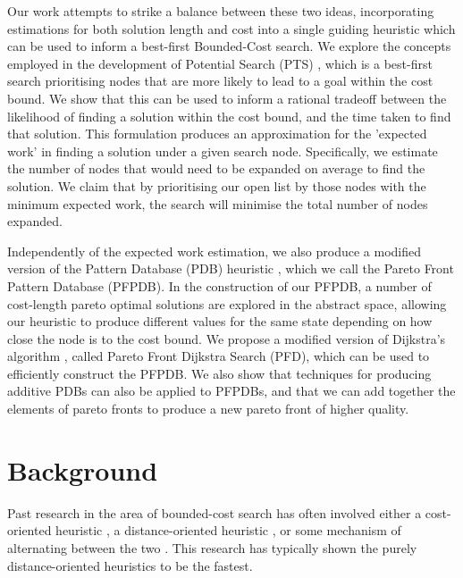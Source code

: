 \documentclass[letterpaper]{article} %
\begin{document}
Our work attempts to strike a balance between these two ideas,
incorporating estimations for both solution length and cost into
a single guiding heuristic which can be used to inform a best-first Bounded-Cost search.
We explore the concepts employed in the development of Potential Search (PTS) \cite{stern2011potential},
which is a best-first search prioritising nodes that are more likely
to lead to a goal within the cost bound.
We show that this can be used to inform a rational tradeoff between the likelihood of finding a solution within the cost bound,
and the time taken to find that solution.
This formulation produces an approximation for the 'expected work'
in finding a solution under a given search node.
Specifically, we estimate the number of nodes that
would need to be expanded on average to find the solution.
We claim that by prioritising our open list by those nodes with the minimum expected work,
the search will minimise the total number of nodes expanded.

Independently of the expected work estimation,
we also produce a modified version of the Pattern Database (PDB) heuristic \cite{culberson1996searching},
which we call the Pareto Front Pattern Database (PFPDB).
In the construction of our PFPDB, a number of cost-length pareto optimal solutions are explored in the abstract space,
allowing our heuristic to produce different values for the same state
depending on how close the node is to the cost bound.
We propose a modified version of Dijkstra's algorithm \cite{dijkstra1959note}, called Pareto Front Dijkstra Search (PFD),
which can be used to efficiently construct the PFPDB.
We also show that techniques for producing additive PDBs \cite{felner2004additive} can also be
applied to PFPDBs, and that we can add together the elements of pareto fronts
to produce a new pareto front of higher quality.

\section{Background}

Past research in the area of bounded-cost search has often involved
either a cost-oriented heuristic \cite{stern2011potential}, a distance-oriented heuristic \cite{haslum2013heuristics},
or some mechanism of alternating between the two \cite{thayer2012faster}.
This research has typically shown the purely distance-oriented heuristics
to be the fastest.
\end{document}
